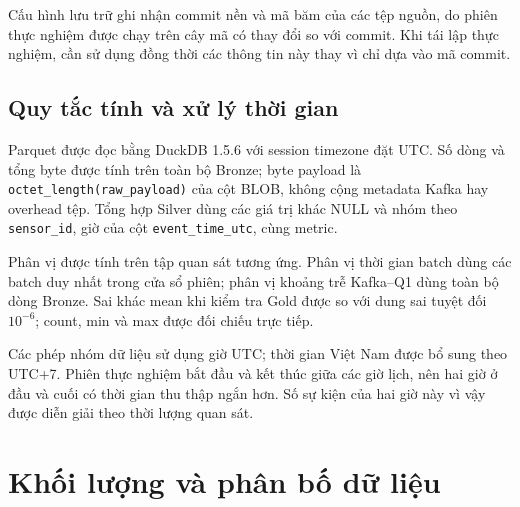 Cấu hình lưu trữ ghi nhận commit nền và mã băm của các tệp nguồn, do phiên thực nghiệm được chạy trên cây mã có thay đổi so với commit. Khi tái lập thực nghiệm, cần sử dụng đồng thời các thông tin này thay vì chỉ dựa vào mã commit.

\subsection{Quy tắc tính và xử lý thời gian}
Parquet được đọc bằng DuckDB 1.5.6 với session timezone đặt UTC. Số dòng và tổng byte được tính trên toàn bộ Bronze; byte payload là \texttt{octet\_length(raw\_payload)} của cột BLOB, không cộng metadata Kafka hay overhead tệp. Tổng hợp Silver dùng các giá trị khác NULL và nhóm theo \texttt{sensor\_id}, giờ của cột \texttt{event\_time\_utc}, cùng metric.

Phân vị được tính trên tập quan sát tương ứng. Phân vị thời gian batch dùng các batch duy nhất trong cửa sổ phiên; phân vị khoảng trễ Kafka--Q1 dùng toàn bộ dòng Bronze. Sai khác mean khi kiểm tra Gold được so với dung sai tuyệt đối $10^{-6}$; count, min và max được đối chiếu trực tiếp.

Các phép nhóm dữ liệu sử dụng giờ UTC; thời gian Việt Nam được bổ sung theo UTC+7. Phiên thực nghiệm bắt đầu và kết thúc giữa các giờ lịch, nên hai giờ ở đầu và cuối có thời gian thu thập ngắn hơn. Số sự kiện của hai giờ này vì vậy được diễn giải theo thời lượng quan sát.

\section{Khối lượng và phân bố dữ liệu}
\label{sec:measured-runtime}

